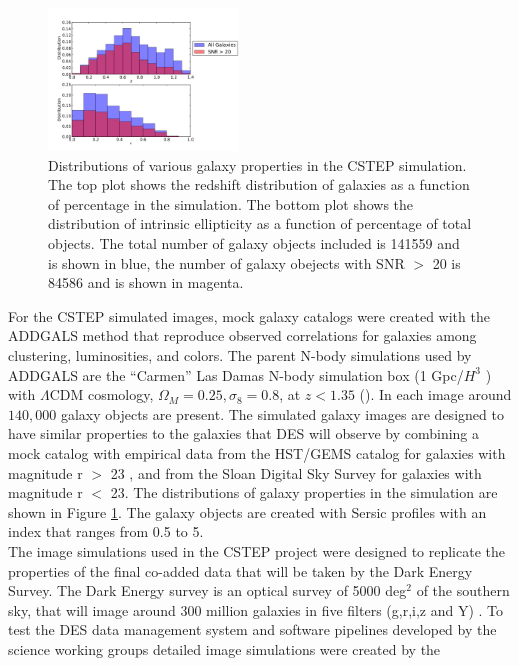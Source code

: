 \begin{figure}
 \centering  %
  \includegraphics[width=0.45\textwidth]{fig/Out_hist_v2_truth.pdf} 
  \caption{Distributions of various galaxy 
properties in the CSTEP simulation. The top plot shows the
redshift distribution of galaxies as a function of percentage in the simulation. 
The bottom plot shows the distribution of intrinsic ellipticity as a
function of percentage of total objects. The
total number of galaxy objects included is 141559 and is shown in blue, the number of
galaxy obejects with SNR $>$ 20 is 84586 and is shown in magenta.}
\label{fig:Galprop}
\end{figure}
\indent For the CSTEP simulated images, mock galaxy catalogs were
created with the ADDGALS  method that reproduce observed correlations
for galaxies among clustering, luminosities, and colors. 
The parent N-body simulations used by ADDGALS are the ``Carmen'' Las Damas
N-body simulation box (1 Gpc/$H^3$ ) with  $ \Lambda$CDM cosmology, $\Omega_M
= 0.25, \sigma_8 = 0.8$, at $z< 1.35 $
(\cite{LasDamas}). In each image around $ 140,000 $ galaxy objects are
present. The simulated galaxy images are designed to have similar properties to
the galaxies that DES will observe by combining a mock
catalog with empirical data from the HST/GEMS catalog for galaxies
with magnitude r $ > $ 23 , and from the Sloan Digital Sky Survey for
galaxies with magnitude r $ < $ 23. The distributions of galaxy
properties in the simulation are shown in Figure \ref{fig:Galprop}. 
The galaxy objects are created with Sersic profiles with an
index that ranges from 0.5 to 5.  \\ 
The image simulations used in the CSTEP project were designed to 
replicate the properties of the final co-added data that will be taken by the 
Dark Energy Survey. The Dark Energy survey is an optical survey of
5000 deg$^2$ of the southern sky, that will image around 300 million
galaxies in five filters (g,r,i,z and Y) \citep{Klaus}. To test the DES
data management system and software pipelines developed by the 
science working groups detailed image simulations were created by the 
